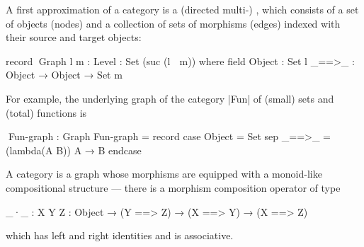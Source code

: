 A first approximation of a category is a (directed multi-) , which consists of a set of objects (nodes) and a collection of sets of morphisms (edges) indexed with their source and target objects:
\begin{code}
record ^^^Graph {l m : Level} : Set (suc (l ⊔ m)) where
  field
    Object    :  Set l
    _==>_     :  Object → Object → Set m
\end{code}
For example, the underlying graph of the category |Fun| of (small) sets and (total) functions is
\begin{code}
^^^Fun-graph : Graph
Fun-graph = record  case  Object  = Set
                    sep   _==>_   = (lambda(A B)) A → B endcase
\end{code}
A category is a graph whose morphisms are equipped with a monoid-like compositional structure --- there is a morphism composition operator of type
\begin{code}
_·_  : {X Y Z : Object} → (Y ==> Z) → (X ==> Y) → (X ==> Z)
\end{code}
which has left and right identities and is associative.


